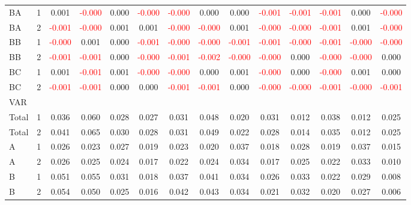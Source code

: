 \begin{table}[!htb]
{\begin{tabular}{llcccccccccccc}
BA & 1 & 0.001 & \textcolor{red}{-0.000} & 0.000 & \textcolor{red}{-0.000} & \textcolor{red}{-0.000} & 0.000 & 0.000 & \textcolor{red}{-0.001} & \textcolor{red}{-0.001} & \textcolor{red}{-0.001} & 0.000 & \textcolor{red}{-0.000}\\
BA & 2 & \textcolor{red}{-0.001} & \textcolor{red}{-0.000} & 0.001 & 0.001 & \textcolor{red}{-0.000} & \textcolor{red}{-0.000} & 0.001 & \textcolor{red}{-0.000} & \textcolor{red}{-0.000} & \textcolor{red}{-0.001} & 0.001 & \textcolor{red}{-0.000}\\
BB & 1 & \textcolor{red}{-0.000} & 0.001 & 0.000 & \textcolor{red}{-0.001} & \textcolor{red}{-0.000} & \textcolor{red}{-0.000} & \textcolor{red}{-0.001} & \textcolor{red}{-0.001} & \textcolor{red}{-0.000} & \textcolor{red}{-0.001} & \textcolor{red}{-0.000} & \textcolor{red}{-0.000}\\
BB & 2 & \textcolor{red}{-0.001} & \textcolor{red}{-0.001} & 0.000 & \textcolor{red}{-0.000} & \textcolor{red}{-0.001} & \textcolor{red}{-0.002} & \textcolor{red}{-0.000} & \textcolor{red}{-0.000} & 0.000 & \textcolor{red}{-0.000} & \textcolor{red}{-0.000} & 0.000\\
BC & 1 & 0.001 & \textcolor{red}{-0.001} & 0.001 & \textcolor{red}{-0.000} & \textcolor{red}{-0.000} & 0.000 & 0.001 & \textcolor{red}{-0.000} & 0.000 & \textcolor{red}{-0.000} & 0.001 & 0.000\\
BC & 2 & \textcolor{red}{-0.001} & \textcolor{red}{-0.001} & 0.000 & 0.000 & \textcolor{red}{-0.001} & \textcolor{red}{-0.001} & 0.000 & \textcolor{red}{-0.000} & \textcolor{red}{-0.000} & \textcolor{red}{-0.001} & \textcolor{red}{-0.000} & \textcolor{red}{-0.001}\\
\hline
VAR &  &  &  &  &  &  &  &  &  &  &  &  & \\
\hline
Total & 1 & 0.036 & 0.060 & 0.028 & 0.027 & 0.031 & 0.048 & 0.020 & 0.031 & 0.012 & 0.038 & 0.012 & 0.025\\
Total & 2 & 0.041 & 0.065 & 0.030 & 0.028 & 0.031 & 0.049 & 0.022 & 0.028 & 0.014 & 0.035 & 0.012 & 0.025\\
A & 1 & 0.026 & 0.023 & 0.027 & 0.019 & 0.023 & 0.020 & 0.037 & 0.018 & 0.028 & 0.019 & 0.037 & 0.015\\
A & 2 & 0.026 & 0.025 & 0.024 & 0.017 & 0.022 & 0.024 & 0.034 & 0.017 & 0.025 & 0.022 & 0.033 & 0.010\\
B & 1 & 0.051 & 0.055 & 0.031 & 0.018 & 0.037 & 0.041 & 0.034 & 0.026 & 0.033 & 0.022 & 0.029 & 0.008\\
B & 2 & 0.054 & 0.050 & 0.025 & 0.016 & 0.042 & 0.043 & 0.034 & 0.021 & 0.032 & 0.020 & 0.027 & 0.006\\

\end{tabular}}
\end{table}
